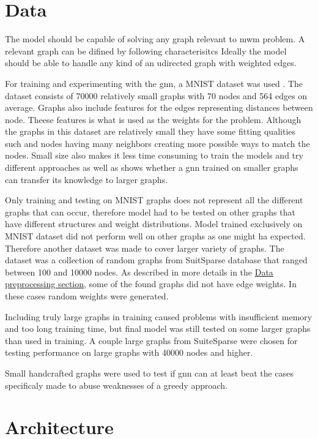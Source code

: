 \section{Data}

The model should be capable of solving any graph relevant to \gls{mwm} problem. A relevant graph can be difined by following characterisitcs
Ideally the model should be able to handle any kind of an udirected graph with weighted edges.

For training and experimenting with the \gls{gnn}, a MNIST dataset was used \cite{dwivedi2022benchmarking}. The dataset consists of 70000 relatively small graphs with 70 nodes and 564 edges on average. Graphs also include features for the edges representing distances between node. Theese features is what is used as the weights for the problem. Although the graphs in this dataset are relatively small they have some fitting qualities such and nodes having many neighbors creating more possible ways to match the nodes. Small size also makes it less time consuming to train the models and try different approaches as well as shows whether a \gls{gnn} trained on smaller graphs can transfer its knowledge to larger graphs.

Only training and testing on MNIST graphs does not represent all the different graphs that can occur, therefore model had to be tested on other graphs that have different structures and weight distributions. Model trained exclusively on MNIST dataset did not perform well on other graphs as one might ha expected. Therefore another dataset was made to cover larger variety of graphs. The dataset was a collection of random graphs from SuitSparse database that ranged between 100 and 10000 nodes. As described in more details in the \hyperref[sec:preprocessing]{Data preprocessing section}, some of the found graphs did not have edge weights. In these cases random weights were generated.

Including truly large graphs in training caused problems with insufficient memory and too long training time, but final model was still tested on some larger graphs than used in training. A couple large graphs from SuiteSparse were chosen for testing performance on large graphs with 40000 nodes and higher.

Small handcrafted graphs were used to test if \gls{gnn} can at least beat the cases specificaly made to abuse weaknesses of a greedy approach.

\section{Architecture}

